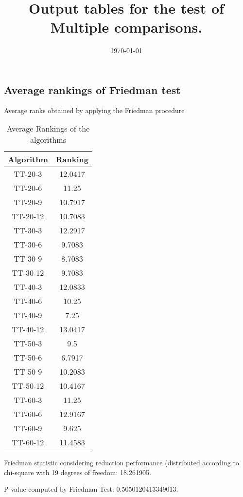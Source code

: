 \documentclass[a4paper,10pt]{article}
\title{Output tables for the test of Multiple comparisons.}
\author{}
\date{\today}
\begin{document}
\begin{landscape}
\pagestyle{empty}
\maketitle
\thispagestyle{empty}
\section{Average rankings of Friedman test}



Average ranks obtained by applying the Friedman procedure

\begin{table}[!htp]
\centering
\begin{tabular}{|c|c|}\hline
Algorithm&Ranking\\\hline
TT-20-3 & 12.0417\\
TT-20-6 & 11.25\\
TT-20-9 & 10.7917\\
TT-20-12 & 10.7083\\
TT-30-3 & 12.2917\\
TT-30-6 & 9.7083\\
TT-30-9 & 8.7083\\
TT-30-12 & 9.7083\\
TT-40-3 & 12.0833\\
TT-40-6 & 10.25\\
TT-40-9 & 7.25\\
TT-40-12 & 13.0417\\
TT-50-3 & 9.5\\
TT-50-6 & 6.7917\\
TT-50-9 & 10.2083\\
TT-50-12 & 10.4167\\
TT-60-3 & 11.25\\
TT-60-6 & 12.9167\\
TT-60-9 & 9.625\\
TT-60-12 & 11.4583\\
\hline
\end{tabular}
\caption{Average Rankings of the algorithms}
\end{table}

Friedman statistic considering reduction performance (distributed according to chi-square with 19 degrees of freedom: 18.261905.

P-value computed by Friedman Test: 0.5050120413349013.\newline




\end{landscape}
\end{document}

